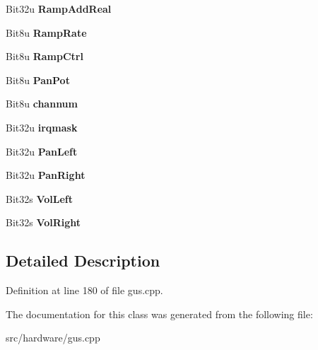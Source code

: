 \begin{DoxyCompactItemize}
\item 
\hypertarget{classGUSChannels_a8a9dc6ee1379a60c06356e00ec21c4d0}{Bit32u {\bfseries Ramp\-Add\-Real}}\label{classGUSChannels_a8a9dc6ee1379a60c06356e00ec21c4d0}

\item 
\hypertarget{classGUSChannels_a795f8eff74ef91bcd3f2e56786b2ae7f}{Bit8u {\bfseries Ramp\-Rate}}\label{classGUSChannels_a795f8eff74ef91bcd3f2e56786b2ae7f}

\item 
\hypertarget{classGUSChannels_a5e53c3d380059e69241d4c2228d6b963}{Bit8u {\bfseries Ramp\-Ctrl}}\label{classGUSChannels_a5e53c3d380059e69241d4c2228d6b963}

\item 
\hypertarget{classGUSChannels_adfc57391f631967a421c68151bc8d406}{Bit8u {\bfseries Pan\-Pot}}\label{classGUSChannels_adfc57391f631967a421c68151bc8d406}

\item 
\hypertarget{classGUSChannels_ac4025f25e64fc8c0f235cdd513faf16b}{Bit8u {\bfseries channum}}\label{classGUSChannels_ac4025f25e64fc8c0f235cdd513faf16b}

\item 
\hypertarget{classGUSChannels_ab2ef78abf686814c7473539bcc197bb5}{Bit32u {\bfseries irqmask}}\label{classGUSChannels_ab2ef78abf686814c7473539bcc197bb5}

\item 
\hypertarget{classGUSChannels_a4285b8115475dff18dea76784d83ba7c}{Bit32u {\bfseries Pan\-Left}}\label{classGUSChannels_a4285b8115475dff18dea76784d83ba7c}

\item 
\hypertarget{classGUSChannels_a09b3ccc1cf8099c083e3c238ad1d8778}{Bit32u {\bfseries Pan\-Right}}\label{classGUSChannels_a09b3ccc1cf8099c083e3c238ad1d8778}

\item 
\hypertarget{classGUSChannels_a0aeb797744c172611694b90b15d50e56}{Bit32s {\bfseries Vol\-Left}}\label{classGUSChannels_a0aeb797744c172611694b90b15d50e56}

\item 
\hypertarget{classGUSChannels_a65730a7c7a5b4b64ca4519604a44b56c}{Bit32s {\bfseries Vol\-Right}}\label{classGUSChannels_a65730a7c7a5b4b64ca4519604a44b56c}

\end{DoxyCompactItemize}


\subsection{Detailed Description}


Definition at line 180 of file gus.\-cpp.



The documentation for this class was generated from the following file\-:\begin{DoxyCompactItemize}
\item 
src/hardware/gus.\-cpp\end{DoxyCompactItemize}
